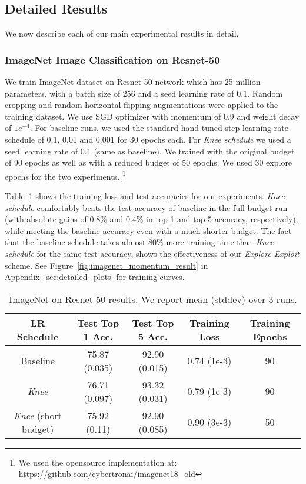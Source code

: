 \documentclass[twoside,11pt]{article}
\newcommand{\lrschedule}{\textit{Knee schedule}}
\newcommand{\lrscheduleshort}{\textit{Knee}}
\begin{document}
\subsection{Detailed Results}

We now describe each of our main experimental results in detail.

\subsubsection{ImageNet Image Classification on Resnet-50}

We train ImageNet dataset \citep{imagenet-dataset} on Resnet-50 network \citep{resnet_he_2016} which has 25 million parameters, with a batch size of 256 and a seed learning rate of 0.1. Random cropping and random horizontal flipping augmentations were applied to the training dataset.  We use SGD optimizer with momentum of 0.9 and weight decay of $1e^{-4}$.
For baseline runs, we used the standard hand-tuned step learning rate schedule of 0.1, 0.01 and 0.001 for 30 epochs each. For \lrschedule{} we used a seed learning rate of 0.1 (same as baseline). We trained with the original budget of 90 epochs as well as with a reduced budget of 50 epochs. We used 30 explore epochs for the two experiments. \footnote{We used the opensource implementation at: https://github.com/cybertronai/imagenet18\_old}

Table~\ref{tab:imagenet_test_training_loss} shows the training loss and test accuracies for our experiments. \lrschedule{} comfortably beats the test accuracy of baseline in the full budget run
(with absolute gains of 0.8\% and 0.4\% in top-1 and top-5 accuracy, respectively), while meeting the baseline accuracy even with a much shorter budget. The fact that the baseline schedule takes almost $80\%$ more training time than \lrschedule{} for the same test accuracy, shows the effectiveness of our \textit{Explore-Exploit} scheme.
See Figure~\ref{fig:imagenet_momentum_result} in Appendix~\ref{sec:detailed_plots} for training curves.

\begin{table}[h]
\small
\centering
\caption{ImageNet on Resnet-50 results. We report mean (stddev) over 3 runs.}
\label{tab:imagenet_test_training_loss}
\begin{tabular}{ccccc}
\toprule
\multirow{1}{*}{LR Schedule}  & Test Top 1 Acc. & Test Top 5 Acc. & Training Loss & Training Epochs\\
\midrule
Baseline     & \multirow{1}{*}{75.87 (0.035)} & \multirow{1}{*}{92.90 (0.015)} & \multirow{1}{*}{0.74 (1e-3)} & 90\\
\lrscheduleshort{}     & \multirow{1}{*}{76.71 (0.097)} & \multirow{1}{*}{93.32 (0.031)} & \multirow{1}{*}{0.79 (1e-3)} & 90\\
\lrscheduleshort{} (short budget)    & \multirow{1}{*}{75.92 (0.11)} & \multirow{1}{*}{92.90 (0.085)} & \multirow{1}{*}{0.90 (3e-3)} & 50\\
\bottomrule
\end{tabular}
\end{table}
\end{document}

